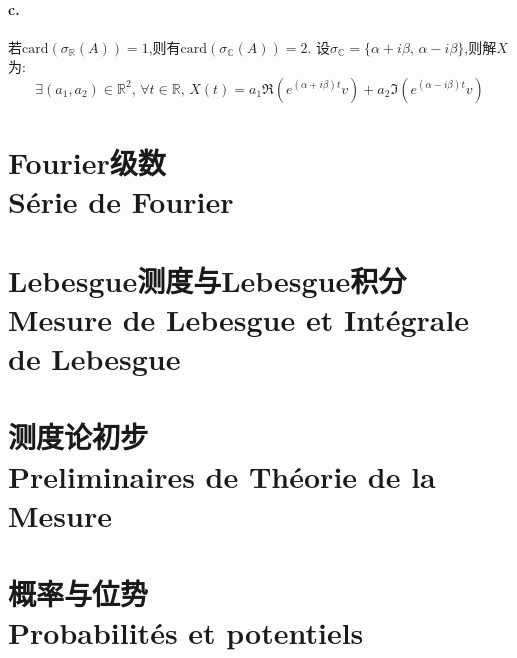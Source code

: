 \documentclass[12pt, a4paper, oneside]{ctexbook}
\newcommand{\card }{\text{card}}%
\newcommand{\R }{\mathbb{R}}%
\renewcommand{\S}{\mathcal{S}}%
\newcommand{\Com }{\mathbb{C}}%
\begin{document}
  \subsubsection{c.}
  若$\card(\sigma_\R(A))=1$,则有$\card(\sigma_\Com(A))=2$.
  设$\sigma_\Com=\{\alpha+i\beta,\,\alpha-i\beta\}$,则解$X$为:
  $$
    \exists(a_1,a_2)\in\R^2,\,\forall t\in\R,\,X(t)=a_1\Re(e^{(\alpha+i\beta)t}v)+a_2\Im(e^{(\alpha-i\beta)t}v)
  $$












  \chapter{Fourier级数\\Série de Fourier}

  \chapter{Lebesgue测度与Lebesgue积分\\ Mesure de Lebesgue et Intégrale de Lebesgue}

  \chapter{测度论初步\\Preliminaires de Théorie de la Mesure}

  \chapter{概率与位势\\ Probabilités et potentiels}  







\ifx\allfiles\undefined
\end{document}
